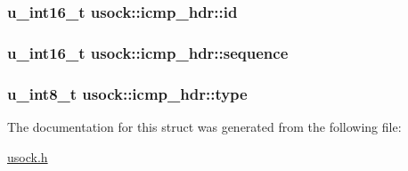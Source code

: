 \hypertarget{structusock_1_1icmp__hdr_7dd79bef263983762bbc24ed48dba718}{
\subsubsection[{id}]{\setlength{\rightskip}{0pt plus 5cm}u\_\-int16\_\-t {\bf usock::icmp\_\-hdr::id}}}
\label{structusock_1_1icmp__hdr_7dd79bef263983762bbc24ed48dba718}


\hypertarget{structusock_1_1icmp__hdr_ca8be88ccbb4acabf013ad4224bd45e3}{
\subsubsection[{sequence}]{\setlength{\rightskip}{0pt plus 5cm}u\_\-int16\_\-t {\bf usock::icmp\_\-hdr::sequence}}}
\label{structusock_1_1icmp__hdr_ca8be88ccbb4acabf013ad4224bd45e3}


\hypertarget{structusock_1_1icmp__hdr_4a51d3f1507a10307c33a1d1dff58ab5}{
\subsubsection[{type}]{\setlength{\rightskip}{0pt plus 5cm}u\_\-int8\_\-t {\bf usock::icmp\_\-hdr::type}}}
\label{structusock_1_1icmp__hdr_4a51d3f1507a10307c33a1d1dff58ab5}




The documentation for this struct was generated from the following file:\begin{CompactItemize}
\item 
\hyperlink{usock_8h}{usock.h}\end{CompactItemize}
